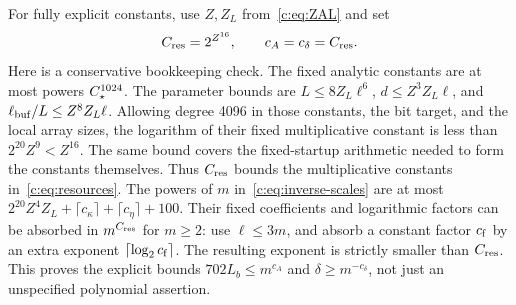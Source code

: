 For fully explicit constants, use $Z,Z_L$ from~\eqref{c:eq:ZAL} and set
\begin{equation}
 C_{\rm res}=2^{Z^{16}},\qquad c_A=c_\delta=C_{\rm res}.                         \label{c:eq:theoremconstants}
\end{equation}
Here is a conservative bookkeeping check. The fixed analytic constants
are at most powers $C_\star^{1024}$. The parameter bounds are
$L\le8Z_L\ell^6$, $d\le Z^3Z_L\ell$, and
$\ell_{\rm buf}/L\le Z^8Z_L\ell$. Allowing degree 4096 in those constants,
the bit target, and the local array sizes, the logarithm of their fixed
multiplicative constant is less than
$2^{20}Z^9<Z^{16}$. The same bound covers the fixed-startup arithmetic
needed to form the constants themselves. Thus $C_{\rm res}$ bounds the
multiplicative constants in~\eqref{c:eq:resources}.
The powers of $m$ in~\eqref{c:eq:inverse-scales} are at most
$2^{20}Z^4Z_L+\lceil c_\kappa\rceil+\lceil c_\eta\rceil+100$.
Their fixed coefficients and logarithmic factors can be absorbed in
$m^{C_{\rm res}}$ for $m\ge2$: use $\ell\le3m$, and absorb a constant factor $c_{\rm f}$ by
an extra exponent $\lceil\log_2c_{\rm f}\rceil$. The resulting exponent is
strictly smaller than $C_{\rm res}$. This proves the explicit bounds
$702L_b\le m^{c_A}$ and $\delta\ge m^{-c_\delta}$, not just an unspecified
polynomial assertion.

